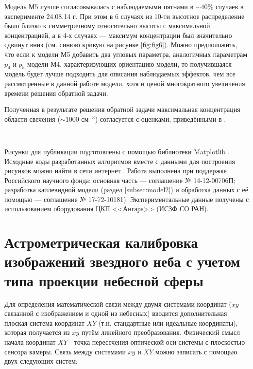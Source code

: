 \documentclass[12pt,a4paper]{article}
\begin{document}
Модель М5 лучше согласовывалась с наблюдаемыми пятнами в $\sim40\%$ случаев в эксперименте 24.08.14 г. При этом в 6 случаях из 10-ти высотное распределение было близко к симметричному относительно высоты с максимальной концентрацией, а в 4-х случаях --- максимум концентрации был значительно сдвинут вниз (см. синюю кривую на рисунке \ref{fig:fig6}). Можно предположить, что если к модели М5 добавить два угловых параметра, аналогичных параметрам $p_4$ и $p_5$ модели М4, характеризующих ориентацию модели, то получившаяся модель будет лучше подходить для описания наблюдаемых эффектов, чем все рассмотренные в данной работе модели, хотя и ценой многократного увеличения времени решения обратной задачи.

Полученная в результате решения обратной задачи максимальная концентрация области свечения ($\sim1000$ см$^{-3}$) согласуется с оценками, приведёнными в \cite{Klimenko2017}.


~\

Рисунки для публикации подготовлены с помощью библиотеки Mat\-plotlib \cite{Hunter2007}. Исходные коды разработанных алгоритмов вместе с данными для построения рисунков можно найти в сети интернет \cite{Shindin2017}.
Работа выполнена при поддержке Российского научного фонда: основная часть --- соглашение № 14-12-00706П; разработка каплевидной модели (раздел \ref{subsec:model2}) и обработка данных с её помощью --- соглашение № 17-72-10181). Экспериментальные данные получены с использованием оборудования ЦКП <<Ангара>> (ИСЗФ СО РАН). 

\renewcommand{\thesection}{\Asbuk{section}}

\appendix
\titleformat{\section}[display]
{\normalfont\Large\bfseries}{Приложение \thesection}{0pt}{\Large}

\section{Астрометрическая калибровка изображений звездного неба с учетом типа проекции небесной сферы} \label{app:astrometric}

Для определения математической связи между двумя системами координат ($xy$ связанной с изображением и одной из небесных) вводится дополнительная плоская система координат $XY$ (т.н. стандартные или идеальные координаты), которая получается из $xy$ путём линейного преобразования. Физический смысл начала координат $XY$ - точка пересечения оптической оси системы с плоскостью сенсора камеры. Связь между системами $xy$ и $XY$ можно записать с помощью двух следующих систем:
\end{document}
